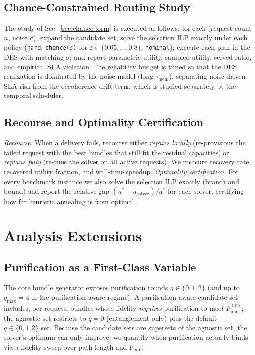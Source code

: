 \documentclass[twocolumn]{article}
\begin{document}
\subsection{Chance-Constrained Routing Study}
\label{sec:chance}

The study of Sec.~\ref{sec:chance-form} is executed as follows: for
each (request count $n$, noise $\sigma$), expand the candidate set;
solve the selection ILP exactly under each policy
(\texttt{hard}, \texttt{chance($\varepsilon$)} for
$\varepsilon \in \{0.05,\dots,0.8\}$, \texttt{nominal}); execute each
plan in the DES with matching $\sigma$; and report parametric utility,
sampled utility, served ratio, and empirical SLA violation.  The
reliability budget is tuned so that the DES realization is dominated
by the noise model (long $\tau_{\text{mem}}$), separating
noise-driven SLA risk from the decoherence-drift term, which is
studied separately by the temporal scheduler.

\subsection{Recourse and Optimality Certification}
\label{sec:recourse-opt}

\emph{Recourse.}  When a delivery fails, recourse either
\emph{repairs locally} (re-provisions the failed request with the best
bundles that still fit the residual capacities) or \emph{replans
fully} (re-runs the solver on all active requests).  We measure
recovery rate, recovered utility fraction, and wall-time speedup.
\emph{Optimality certification.}  For every benchmark instance we also
solve the selection ILP exactly (branch and bound) and report the
relative gap $(u^\ast - u_{\text{solver}})/u^\ast$ for each solver,
certifying how far heuristic annealing is from optimal.

\section{Analysis Extensions}
\label{sec:extensions}

\subsection{Purification as a First-Class Variable}
\label{sec:purification}

The core bundle generator exposes purification rounds $q \in \{0,1,2\}$
(and up to $q_{\max}=4$ in the purification-aware regime).  A
purification-aware candidate set includes, per request, bundles whose
fidelity \emph{requires} purification to meet $F_{\min}^{(r)}$; the
agnostic set restricts to $q=0$ (entanglement-only) plus the default
$q\in\{0,1,2\}$ set.  Because the candidate sets are supersets of the
agnostic set, the solver's optimum can only improve; we quantify when
purification actually binds via a fidelity sweep over path length and
$F_{\min}$.
\end{document}
